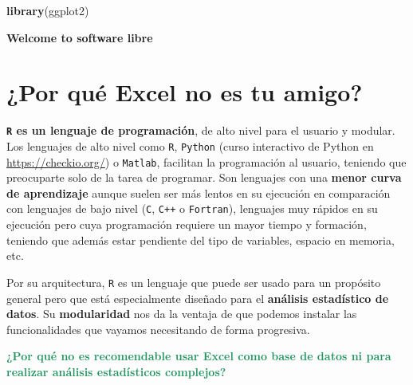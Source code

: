 \documentclass[11pt,]{book}
\newenvironment{Shaded}{\begin{snugshade}}{\end{snugshade}}
\newcommand{\KeywordTok}[1]{\textcolor[rgb]{0.27,0.27,0.27}{\textbf{#1}}}
\newcommand{\NormalTok}[1]{#1}
\begin{document}
\begin{Shaded}
\begin{Highlighting}[]
\KeywordTok{library}\NormalTok{(ggplot2)}
\end{Highlighting}
\end{Shaded}

\textbf{Welcome to software libre}

\hypertarget{por-quuxe9-excel-no-es-tu-amigo}{%
\section{¿Por qué Excel no es tu amigo?}\label{por-quuxe9-excel-no-es-tu-amigo}}

\textbf{\texttt{R} es un lenguaje de programación}, de alto nivel para el usuario y modular. Los lenguajes de alto nivel como \texttt{R}, \texttt{Python} (curso interactivo de Python en \url{https://checkio.org/}) o \texttt{Matlab}, facilitan la programación al usuario, teniendo que preocuparte solo de la tarea de programar. Son lenguajes con una \textbf{menor curva de aprendizaje} aunque suelen ser más lentos en su ejecución en comparación con lenguajes de bajo nivel (\texttt{C}, \texttt{C++} o \texttt{Fortran}), lenguajes muy rápidos en su ejecución pero cuya programación requiere un mayor tiempo y formación, teniendo que además estar pendiente del tipo de variables, espacio en memoria, etc.

Por su arquitectura, \texttt{R} es un lenguaje que puede ser usado para un propósito general pero que está especialmente diseñado para el \textbf{análisis estadístico de datos}. Su \textbf{modularidad} nos da la ventaja de que podemos instalar las funcionalidades que vayamos necesitando de forma progresiva.

\textbf{\textcolor{#20935E}{¿Por qué no es recomendable usar Excel como base de datos ni para realizar análisis estadísticos complejos?}}

~
\end{document}
